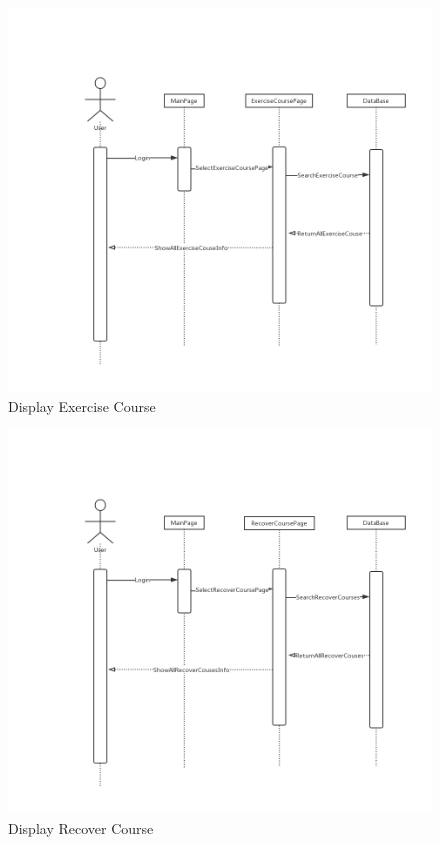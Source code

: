 \documentclass[16pt]{scrreprt}
\begin{document}
\begin{figure}[H]
    \includegraphics[width=\linewidth]{./FuncPhoto/5.png}   
    \caption{Display Exercise Course}
\end{figure}

\begin{figure}[H]
    \includegraphics[width=\linewidth]{./FuncPhoto/6.png}   
    \caption{Display Recover Course}
\end{figure}
\end{document}
